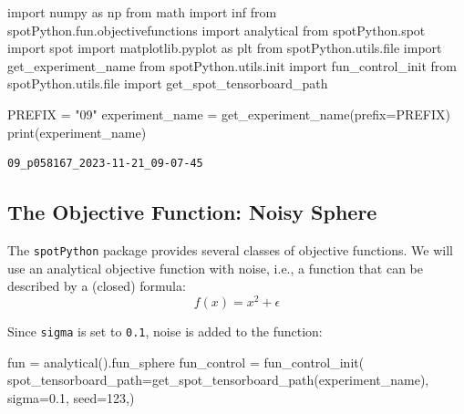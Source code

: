 \documentclass[
  letterpaper,
  DIV=11,
  numbers=noendperiod]{scrreprt}
\newenvironment{Shaded}{\begin{snugshade}}{\end{snugshade}}
\newcommand{\BuiltInTok}[1]{\textcolor[rgb]{0.00,0.23,0.31}{#1}}
\newcommand{\DecValTok}[1]{\textcolor[rgb]{0.68,0.00,0.00}{#1}}
\newcommand{\FloatTok}[1]{\textcolor[rgb]{0.68,0.00,0.00}{#1}}
\newcommand{\ImportTok}[1]{\textcolor[rgb]{0.00,0.46,0.62}{#1}}
\newcommand{\NormalTok}[1]{\textcolor[rgb]{0.00,0.23,0.31}{#1}}
\newcommand{\OperatorTok}[1]{\textcolor[rgb]{0.37,0.37,0.37}{#1}}
\newcommand{\StringTok}[1]{\textcolor[rgb]{0.13,0.47,0.30}{#1}}
\begin{document}
\begin{Shaded}
\begin{Highlighting}[]
\ImportTok{import}\NormalTok{ numpy }\ImportTok{as}\NormalTok{ np}
\ImportTok{from}\NormalTok{ math }\ImportTok{import}\NormalTok{ inf}
\ImportTok{from}\NormalTok{ spotPython.fun.objectivefunctions }\ImportTok{import}\NormalTok{ analytical}
\ImportTok{from}\NormalTok{ spotPython.spot }\ImportTok{import}\NormalTok{ spot}
\ImportTok{import}\NormalTok{ matplotlib.pyplot }\ImportTok{as}\NormalTok{ plt}
\ImportTok{from}\NormalTok{ spotPython.utils.}\BuiltInTok{file} \ImportTok{import}\NormalTok{ get\_experiment\_name}
\ImportTok{from}\NormalTok{ spotPython.utils.init }\ImportTok{import}\NormalTok{ fun\_control\_init}
\ImportTok{from}\NormalTok{ spotPython.utils.}\BuiltInTok{file} \ImportTok{import}\NormalTok{ get\_spot\_tensorboard\_path}

\NormalTok{PREFIX }\OperatorTok{=} \StringTok{"09"}
\NormalTok{experiment\_name }\OperatorTok{=}\NormalTok{ get\_experiment\_name(prefix}\OperatorTok{=}\NormalTok{PREFIX)}
\BuiltInTok{print}\NormalTok{(experiment\_name)}
\end{Highlighting}
\end{Shaded}

\begin{verbatim}
09_p058167_2023-11-21_09-07-45
\end{verbatim}

\hypertarget{the-objective-function-noisy-sphere-1}{%
\subsection{The Objective Function: Noisy
Sphere}\label{the-objective-function-noisy-sphere-1}}

The \texttt{spotPython} package provides several classes of objective
functions. We will use an analytical objective function with noise,
i.e., a function that can be described by a (closed) formula:
\[f(x) = x^2 + \epsilon\]

Since \texttt{sigma} is set to \texttt{0.1}, noise is added to the
function:

\begin{Shaded}
\begin{Highlighting}[]
\NormalTok{fun }\OperatorTok{=}\NormalTok{ analytical().fun\_sphere}
\NormalTok{fun\_control }\OperatorTok{=}\NormalTok{ fun\_control\_init(}
\NormalTok{    spot\_tensorboard\_path}\OperatorTok{=}\NormalTok{get\_spot\_tensorboard\_path(experiment\_name),}
\NormalTok{    sigma}\OperatorTok{=}\FloatTok{0.1}\NormalTok{,}
\NormalTok{    seed}\OperatorTok{=}\DecValTok{123}\NormalTok{,)}
\end{Highlighting}
\end{Shaded}
\end{document}
